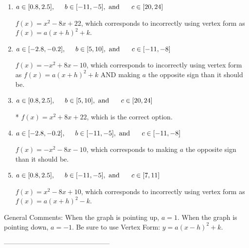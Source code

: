\documentclass{extbook}[14pt]
\begin{document}
\begin{enumerate}[label=\Alph*.] 
\item $ a \in [0.8, 2.5], \hspace*{5mm} b \in [-11, -5], \text{ and } \hspace*{5mm} c \in [20, 24] $ 

 $f(x)=x^{2} -8 x + 22$, which corresponds to incorrectly using vertex form as $f(x) = a(x+h)^2+k$. 
\item $ a \in [-2.8, -0.2], \hspace*{5mm} b \in [5, 10], \text{ and } \hspace*{5mm} c \in [-11, -8] $ 

 $f(x)=-x^{2} +8 x -10$, which corresponds to incorrectly using vertex form as $f(x) = a(x+h)^2+k$ AND making $a$ the opposite sign than it should be. 
\item $ a \in [0.8, 2.5], \hspace*{5mm} b \in [5, 10], \text{ and } \hspace*{5mm} c \in [20, 24] $ 

 * $f(x)=x^{2} +8 x + 22$, which is the correct option. 
\item $ a \in [-2.8, -0.2], \hspace*{5mm} b \in [-11, -5], \text{ and } \hspace*{5mm} c \in [-11, -8] $ 

 $f(x)=-x^{2} -8 x -10$, which corresponds to making $a$ the opposite sign than it should be. 
\item $ a \in [0.8, 2.5], \hspace*{5mm} b \in [-11, -5], \text{ and } \hspace*{5mm} c \in [7, 11] $ 

 $f(x)=x^{2} -8 x + 10$, which corresponds to incorrectly using vertex form as $f(x) = a(x+h)^2 - k$. 
\end{enumerate} 
 
General Comments: When the graph is pointing up, $a=1$. When the graph is pointing down, $a=-1$. Be sure to use Vertex Form: $y = a(x-h)^2+k$.

-----------------------------------------------
\end{document}
